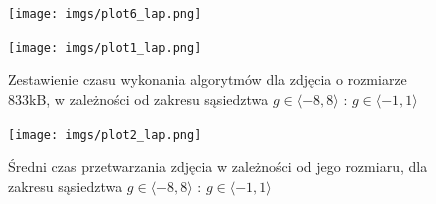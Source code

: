 \documentclass[document.tex]{subfiles}
\begin{document}
\begin{figure}[h]
\texttt{[image: imgs/plot6\_lap.png]}
\caption*{}
\label{fig:results_lap_hybrid}
\end{figure}

\begin{figure}[h]
\texttt{[image: imgs/plot1\_lap.png]}
\caption{Zestawienie czasu wykonania algorytmów dla zdjęcia o rozmiarze 833kB, 
        w zależności od zakresu sąsiedztwa $g\in \langle -8, 8 \rangle$ : $g\in \langle -1, 1 \rangle$ }
\label{fig:results_lap_hybrid}
\end{figure}

\begin{figure}[h]
\texttt{[image: imgs/plot2\_lap.png]}
\caption{Średni czas przetwarzania zdjęcia w zależności od jego rozmiaru, dla zakresu sąsiedztwa $g\in \langle -8, 8 \rangle$ : $g\in \langle -1, 1 \rangle$}
\label{fig:results_lap_hybrid}
\end{figure}
\clearpage

\end{document}
